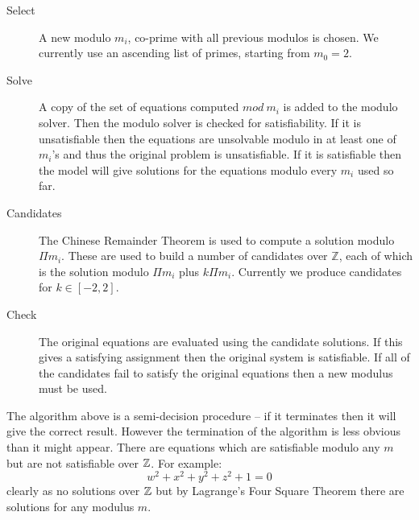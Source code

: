\begin{description}
\item[Select]{A new modulo $m_i$, co-prime with all previous modulos is chosen.
We currently use an ascending list of primes, starting from $m_0 = 2$.}

\item[Solve]{A copy of the set of equations computed $mod\ m_i$ is added
  to the modulo solver.  Then the modulo solver is checked for
  satisfiability.  If it is unsatisfiable then the equations are unsolvable
  modulo in at least one of $m_i$'s and thus the original problem is
  unsatisfiable.  If it is satisfiable then the model will give
  solutions for the equations modulo every $m_i$ used so far.}

\item[Candidates]{The Chinese Remainder Theorem is used to compute
  a solution modulo $\Pi m_i$.  These are used to build a number of
  candidates over $\mathbb{Z}$, each of which is the solution
  modulo $\Pi m_i$ plus $k \Pi m_i$.  Currently we produce candidates
  for  $k \in [-2,2]$.}

\item[Check]{The original equations are evaluated using the candidate
  solutions.  If this gives a satisfying assignment then the original
  system is satisfiable.  If all of the candidates fail to satisfy the
  original equations then a new modulus must be used.}
\end{description}



%

The algorithm above is a semi-decision procedure -- if it terminates
then it will give the correct result.
%
However the termination of the algorithm is less obvious than it might
appear.
%
There are equations which are satisfiable modulo any $m$ but are not
satisfiable over $\mathbb{Z}$.
For example:
%
\begin{equation*}
  w^2 + x^2 + y^2 + z^2 + 1 = 0
\end{equation*}
%
\noindent clearly as no solutions over $\mathbb{Z}$ but by Lagrange's Four
Square Theorem there are solutions for any modulus $m$.
